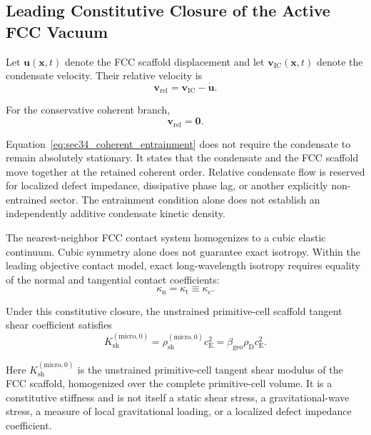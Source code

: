 \subsection*{Leading Constitutive Closure of the Active FCC Vacuum}
\label{subsec:fcc_leading_constitutive_closure}

Let $\mathbf{u}(\mathbf{x},t)$ denote the FCC scaffold displacement and let $\mathbf{v}_{\mathrm{IC}}(\mathbf{x},t)$ denote the condensate velocity. Their relative velocity is
\begin{equation}
    \mathbf{v}_{\mathrm{rel}} = \mathbf{v}_{\mathrm{IC}} - \dot{\mathbf{u}}.
    \label{eq:sec34_relative_velocity}
\end{equation}

For the conservative coherent branch,
\begin{equation}
    \mathbf{v}_{\mathrm{rel}} = \mathbf{0}.
    \label{eq:sec34_coherent_entrainment}
\end{equation}

Equation~\eqref{eq:sec34_coherent_entrainment} does not require the condensate to remain absolutely stationary. It states that the condensate and the FCC scaffold move together at the retained coherent order. Relative condensate flow is reserved for localized defect impedance, dissipative phase lag, or another explicitly non-entrained sector. The entrainment condition alone does not establish an independently additive condensate kinetic density.

The nearest-neighbor FCC contact system homogenizes to a cubic elastic continuum. Cubic symmetry alone does not guarantee exact isotropy. Within the leading objective contact model, exact long-wavelength isotropy requires equality of the normal and tangential contact coefficients:
\begin{equation}
    \kappa_{\mathrm{n}} = \kappa_{\mathrm{t}} \equiv \kappa_{\mathrm{c}}.
    \label{eq:sec34_isotropic_contact_condition}
\end{equation}

Under this constitutive closure, the unstrained primitive-cell scaffold tangent shear coefficient satisfies
\begin{equation}
    K_{\mathrm{sh}}^{(\mathrm{micro},0)} = \rho_{\mathrm{sh}}^{(\mathrm{micro},0)}c_{\mathrm{E}}^2 = \beta_{\mathrm{geo}}\rho_{\mathrm{D}}c_{\mathrm{E}}^2.
    \label{eq:sec34_micro_shear_normalization}
\end{equation}

Here $K_{\mathrm{sh}}^{(\mathrm{micro},0)}$ is the unstrained primitive-cell tangent shear modulus of the FCC scaffold, homogenized over the complete primitive-cell volume. It is a constitutive stiffness and is not itself a static shear stress, a gravitational-wave stress, a measure of local gravitational loading, or a localized defect impedance coefficient.


